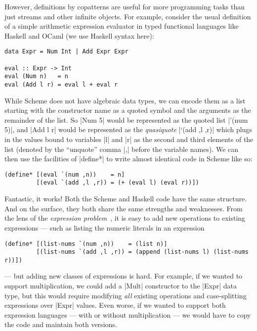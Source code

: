However, definitions by copatterns are useful for more programming tasks than just streams and other infinite objects.
For example, consider the usual definition of a simple arithmetic expression evaluator in typed functional languages like Haskell and OCaml (we use Haskell syntax here):
\begin{verbatim}
data Expr = Num Int | Add Expr Expr

eval :: Expr -> Int
eval (Num n)   = n
eval (Add l r) = eval l + eval r
\end{verbatim}
While Scheme does not have algebraic data types, we can encode them as a list starting with the constructor name as a quoted symbol and the arguments as the remainder of the list.
So \hs|Num 5| would be represented as the quoted list \scm|'(num 5)|, and \scm|Add l r| would be represented as the \emph{quasiquote} \scm|`(add ,l ,r)| which plugs in the values bound to variables \scm|l| and \scm|r| as the second and third elements of the list (denoted by the ``unquote'' comma \scm|,| before the variable names).
We can then use the facilities of \scm|define*| to write almost identical code in Scheme like so:
\begin{verbatim}
(define* [(eval `(num ,n))    = n]
         [(eval `(add ,l ,r)) = (+ (eval l) (eval r))])
\end{verbatim}
Fantastic, it works!
Both the Scheme and Haskell code have the same structure.
And on the surface, they both share the same strengths and weaknesses.
From the lens of the \emph{expression problem}~\cite{ExpressionProblem}, it is easy to add new operations to existing expressions --- such as listing the numeric literals in an expression
\begin{verbatim}
(define* [(list-nums `(num ,n))    = (list n)]
         [(list-nums `(add ,l ,r)) = (append (list-nums l) (list-nums r))])
\end{verbatim}
--- but adding new classes of expressions is hard.
For example, if we wanted to support multiplication, we could add a \hs|Mult| constructor to the \hs|Expr| data type, but this would require modifying \emph{all} existing operations and case-splitting expressions over \hs|Expr| values.
Even worse, if we wanted to support both expression languages --- with or without multiplication --- we would have to copy the code and maintain both versions.

